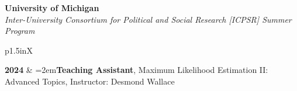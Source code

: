\documentclass[letterpaper,12pt]{article}
\newenvironment{list2}{
  \begin{list}{$\bullet$}{%
      \setlength{\itemsep}{0in}
      \setlength{\parsep}{0in} 
      \setlength{\parskip}{0in}
      \setlength{\topsep}{0in} 
      \setlength{\partopsep}{0in}
      \setlength{\leftmargin}{1in}
      \setlength{\labelsep}{1em}
      \setlength{\labelwidth}{1em}
      \setlength{\itemindent}{-2em}
      \setlength{\listparindent}{2em}}}{\end{list}}
\begin{document}

\textbf{University of Michigan}\\
\textit{Inter-University Consortium for Political and Social Research [ICPSR] Summer Program}
\begin{xltabular}{\dimexpr\textwidth-0in}{p{1.5in}X}

\textbf{2024} 	& \hangindent=2em\textbf{Teaching Assistant}, Maximum Likelihood Estimation II: Advanced Topics, \mbox{Instructor:} Desmond Wallace
\end{xltabular}

\end{document}

